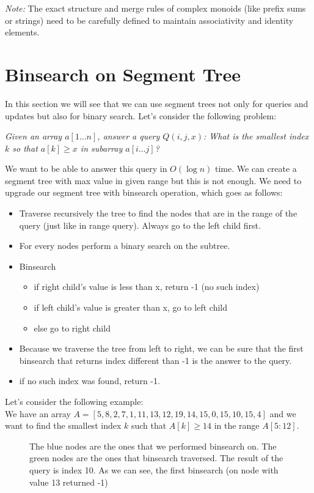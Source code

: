 \documentclass{article}
\begin{document}
\textit{Note:} The exact structure and merge rules of complex monoids (like prefix sums or strings) need to be carefully defined to maintain associativity and identity elements.


\section{Binsearch on Segment Tree}
In this section we will see that we can use segment trees not only for queries and updates but also for
binary search. Let's consider the following problem:
\begin{center}
    \textit{Given an array $a[1 \ldots n]$, answer a query $Q(i, j, x)$: What is the smallest index $k$ so that $a[k] \geq x$ in subarray  $a[i \ldots j]$?}\\[1ex]
\end{center}

We want to be able to answer this query in \(O(\log{n})\) time. We can create 
a segment tree with max value in given range but this is not enough. We need to upgrade our segment tree
with binsearch operation, which goes as follows:
\begin{itemize}
    \item Traverse recursively the tree to find the nodes that are in the range of the query (just like in range query). Always go to the left child first.
    \item For every nodes perform a binary search on the subtree.
    \item Binsearch 
        \begin{itemize}
            \item if right child's value is less than x, return -1 (no such index)
            \item if left child's value is greater than x, go to left child
            \item else go to right child
        \end{itemize}
    \item Because we traverse the tree from left to right, we can be sure that the first binsearch that returns index different than -1 is the answer to the query.
    \item if no such index was found, return -1.
\end{itemize}


\FloatBarrier
Let's consider the following example: \\
We have an array \(A = [5, 8, 2, 7, 1, 11, 13, 12, 19, 14, 15, 0, 15, 10, 15, 4]\) and we want to find the smallest index \(k\) such that \(A[k] \geq 14\) in the range \(A[5:12]\).

\begin{figure}[H]
    \centering
    
    \caption{The blue nodes are the ones that we performed binsearch on. The green nodes are the ones that binsearch traversed. The result of the query is index 10. As we can see, the first binsearch (on node with value 13 returned -1)}
    \label{fig:segment_tree_1}
\end{figure}
\end{document}
